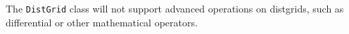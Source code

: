


The {\tt DistGrid} class will not support advanced
operations on distgrids, such as differential or other
mathematical operators.



